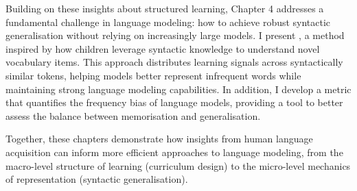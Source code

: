 Building on these insights about structured learning, Chapter 4 addresses a fundamental challenge in language modeling: how to achieve robust syntactic generalisation without relying on increasingly large models. I present \smoothing, a method inspired by how children leverage syntactic knowledge to understand novel vocabulary items. This approach distributes learning signals across syntactically similar tokens, helping models better represent infrequent words while maintaining strong language modeling capabilities. In addition, I develop a metric that quantifies the frequency bias of language models, providing a tool to better assess the balance between memorisation and generalisation.

Together, these chapters demonstrate how insights from human language acquisition can inform more efficient approaches to language modeling, from the macro-level structure of learning (curriculum design) to the micro-level mechanics of representation (syntactic generalisation).